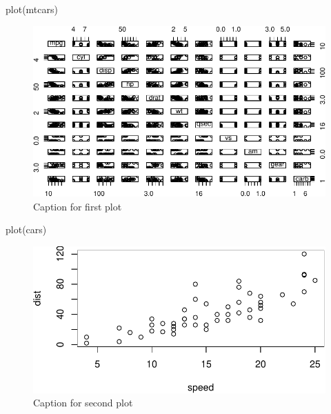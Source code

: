 \documentclass[
  a4paper,
  DIV=11,
  numbers=noendperiod,
  oneside,
  open=any]{scrreprt}
\newenvironment{Shaded}{\begin{snugshade}}{\end{snugshade}}
\newcommand{\FunctionTok}[1]{\textcolor[rgb]{0.28,0.35,0.67}{#1}}
\newcommand{\NormalTok}[1]{\textcolor[rgb]{0.00,0.23,0.31}{#1}}
\begin{document}
\begin{Shaded}
\begin{Highlighting}[]
\FunctionTok{plot}\NormalTok{(mtcars)}
\end{Highlighting}
\end{Shaded}

\begin{figure}[H]

{\centering \includegraphics{lightbox_files/figure-pdf/unnamed-chunk-3-1.pdf}

}

\caption{Caption for first plot}

\end{figure}%

\begin{Shaded}
\begin{Highlighting}[]
\FunctionTok{plot}\NormalTok{(cars)}
\end{Highlighting}
\end{Shaded}

\begin{figure}[H]

{\centering \includegraphics{lightbox_files/figure-pdf/unnamed-chunk-3-2.pdf}

}

\caption{Caption for second plot}

\end{figure}%
\end{document}
